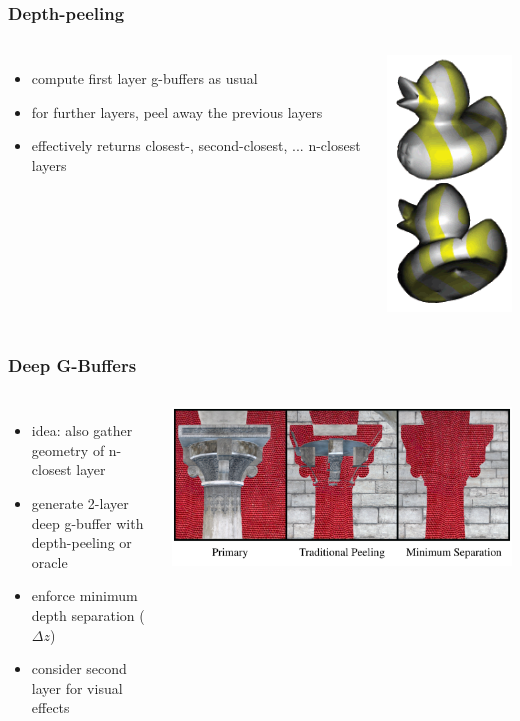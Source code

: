 \documentclass[aspectratio=169]{beamer}
\begin{document}
	\begin{frame}
		\frametitle{Depth-peeling}
		\begin{columns}
				\begin{itemize}
					\item compute first layer g-buffers as usual
					\item for further layers, peel away the previous layers
					\item effectively returns closest-, second-closest, ... n-closest layers
				\end{itemize}
				\includegraphics[height=.8\textheight]{img/depth_peeling_duck.png}
		\end{columns}
	\end{frame}	

	\begin{frame}
		\frametitle{Deep G-Buffers}
		\begin{columns}
			\column{.5\textwidth}
				\begin{itemize}
					\item idea: also gather geometry of n-closest layer
					\item generate 2-layer deep g-buffer with depth-peeling or oracle
					\item enforce minimum depth separation ($\Delta z$)
					\item consider second layer for visual effects
				\end{itemize}
			\column{.5\textwidth}
				\includegraphics[height=.49\textwidth]{img/minimum_depth_separation.png}
		\end{columns}
	\end{frame}	
\end{document}
